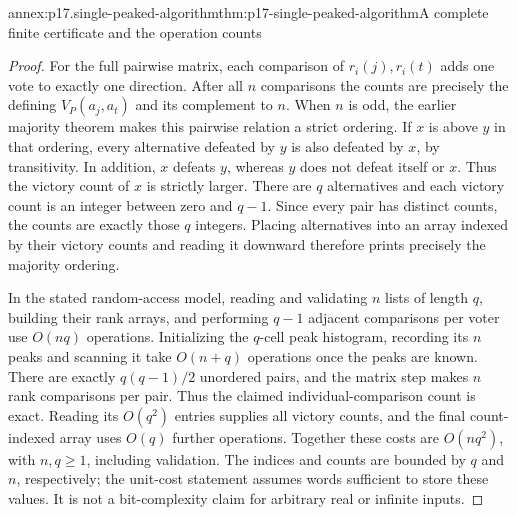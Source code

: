 \begin{annexitem}{annex:p17.single-peaked-algorithm}{thm:p17-single-peaked-algorithm}{A complete finite certificate and the operation counts}
\begin{proof}
For the full pairwise matrix, each comparison of \(r_i(j),r_i(t)\)
adds one vote to exactly one direction. After all \(n\) comparisons
the counts are precisely the defining \(V_P(a_j,a_t)\) and its
complement to \(n\). When \(n\) is odd, the earlier majority
theorem makes this pairwise relation a strict ordering. If \(x\)
is above \(y\) in that ordering, every alternative defeated by
\(y\) is also defeated by \(x\), by transitivity. In addition,
\(x\) defeats \(y\), whereas \(y\) does not defeat itself
or \(x\). Thus the victory count of \(x\) is strictly larger.
There are \(q\) alternatives and each victory count is an integer
between zero and \(q-1\). Since every pair has distinct counts,
the counts are exactly those \(q\) integers. Placing alternatives
into an array indexed by their victory counts and reading it downward
therefore prints precisely the majority ordering.

In the stated random-access model, reading and validating \(n\)
lists of length \(q\), building their rank arrays, and performing
\(q-1\) adjacent comparisons per voter use \(O(nq)\) operations.
Initializing the \(q\)-cell peak histogram, recording its \(n\)
peaks and scanning it take \(O(n+q)\) operations once the peaks
are known. There are exactly \(q(q-1)/2\) unordered pairs, and
the matrix step makes \(n\) rank comparisons per pair. Thus the
claimed individual-comparison count is exact. Reading its \(O(q^2)\)
entries supplies all victory counts, and the final count-indexed array
uses \(O(q)\) further operations. Together these costs are
\(O(nq^2)\), with \(n,q\geq1\), including validation.
The indices and counts are bounded by \(q\) and \(n\), respectively;
the unit-cost statement assumes words sufficient to store these values.
It is not a bit-complexity claim for arbitrary real or infinite inputs.
\end{proof}
\end{annexitem}

